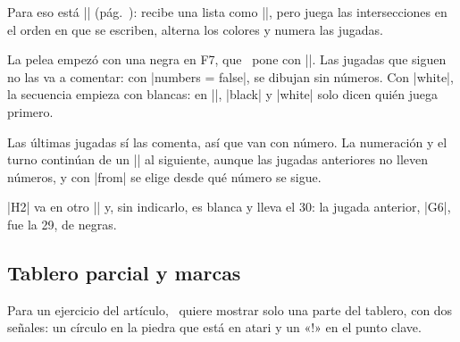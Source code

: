 \begin{goban}
Para eso está |\moves| (pág.~\pageref{subsec:movimientos}): recibe una lista como |\stones|, pero juega las intersecciones en el orden en que se escriben, alterna los colores y numera las jugadas.

\begin{codeexample}[width=5cm]
\begin{goban}[label = {at = all}]
\end{goban}
\end{codeexample}

La pelea empezó con una negra en F7, que \karu\ pone con |\stone|. Las jugadas que siguen no las va a comentar: con |numbers = false|, se dibujan sin números. Con |white|, la secuencia empieza con blancas: en |\moves|, |black| y |white| solo dicen quién juega primero.

\begin{codeexample}[width=5cm]
\begin{goban}[label = {at = all}]
\end{goban}
\end{codeexample}

Las últimas jugadas sí las comenta, así que van con número. La numeración y el turno continúan de un |\moves| al siguiente, aunque las jugadas anteriores no lleven números, y con |from| se elige desde qué número se sigue.

\begin{codeexample}[width=5cm]
\begin{goban}[label = {at = all}]
	
\end{goban}
\end{codeexample}

|H2| va en otro |\moves| y, sin indicarlo, es blanca y lleva el 30: la jugada anterior, |G6|, fue la 29, de negras.

\subsection{Tablero parcial y marcas}
\label{tut:parcial}

Para un ejercicio del artículo, \karu\ quiere mostrar solo una parte del tablero, con dos señales: un círculo en la piedra que está en atari y un «!» en el punto clave.


\end{goban}
